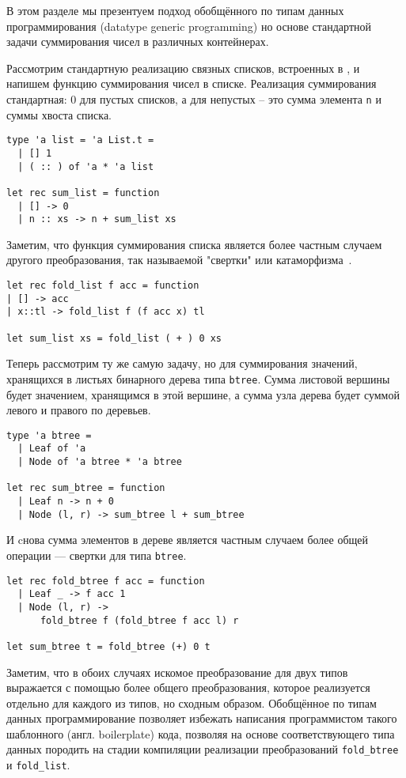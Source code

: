
В этом разделе мы презентуем подход обобщённого по типам данных программирования (datatype generic programming) но основе стандартной задачи суммирования чисел в различных контейнерах.

Рассмотрим стандартную реализацию связных списков, встроенных в \ocaml{}, и напишем функцию суммирования чисел в  списке. Реализация суммирования стандартная: 0 для пустых списков, а для непустых -- это сумма элемента \lstinline{n} и суммы хвоста списка.

\begin{lstlisting}
type 'a list = 'a List.t = 
  | [] 1
  | ( :: ) of 'a * 'a list

let rec sum_list = function 
  | [] -> 0 
  | n :: xs -> n + sum_list xs
\end{lstlisting}

Заметим, что функция суммирования списка является более частным случаем другого преобразования, так называемой "свертки" или катаморфизма~\cite{DGP}.

\begin{lstlisting}
let rec fold_list f acc = function 
| [] -> acc 
| x::tl -> fold_list f (f acc x) tl 

let sum_list xs = fold_list ( + ) 0 xs
\end{lstlisting}

Теперь рассмотрим ту же самую задачу, но для суммирования значений, хранящихся в листьях бинарного дерева типа \lstinline{btree}. Сумма листовой вершины будет значением, хранящимся в этой вершине, а сумма узла дерева будет суммой левого и правого по деревьев.

\begin{lstlisting}
type 'a btree = 
  | Leaf of 'a 
  | Node of 'a btree * 'a btree

let rec sum_btree = function
  | Leaf n -> n + 0
  | Node (l, r) -> sum_btree l + sum_btree
\end{lstlisting}

И cнова сумма элементов в дереве является частным случаем более общей операции --- свертки для типа \lstinline{btree}.
\begin{lstlisting}
let rec fold_btree f acc = function
  | Leaf _ -> f acc 1
  | Node (l, r) -> 
      fold_btree f (fold_btree f acc l) r

let sum_btree t = fold_btree (+) 0 t
\end{lstlisting}

Заметим, что в обоих случаях искомое преобразование для двух типов выражается с помощью более общего преобразования, которое реализуется отдельно для каждого из типов, но сходным образом. Обобщённое по типам данных программирование позволяет избежать написания программистом такого шаблонного (англ. boilerplate) кода, позволяя на основе соответствующего типа данных породить на стадии компиляции реализации преобразований \lstinline{fold_btree} и \lstinline{fold_list}.

